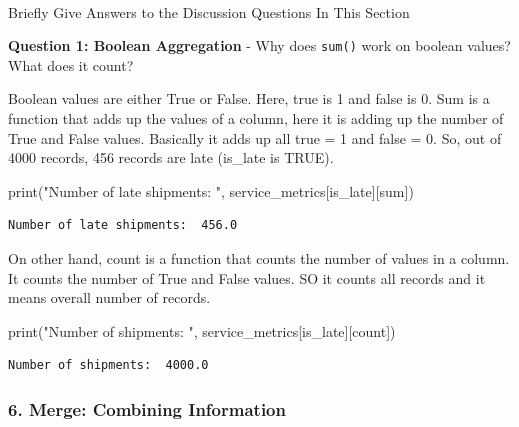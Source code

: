 \documentclass[
]{article}
\makeatletter
\let\oldparagraph\paragraph
\renewcommand{\paragraph}{
    \@ifstar
      \xxxParagraphStar
      \xxxParagraphNoStar
  }
\newcommand{\xxxParagraphStar}[1]{\oldparagraph*{#1}\mbox{}}
\newcommand{\xxxParagraphNoStar}[1]{\oldparagraph{#1}\mbox{}}
\newenvironment{Shaded}{\begin{snugshade}}{\end{snugshade}}
\newcommand{\BuiltInTok}[1]{\textcolor[rgb]{0.00,0.23,0.31}{#1}}
\newcommand{\NormalTok}[1]{\textcolor[rgb]{0.00,0.23,0.31}{#1}}
\newcommand{\StringTok}[1]{\textcolor[rgb]{0.13,0.47,0.30}{#1}}
\makeatother
\begin{document}
\paragraph{Briefly Give Answers to the Discussion Questions In This
Section}\label{briefly-give-answers-to-the-discussion-questions-in-this-section-4}

\textbf{Question 1: Boolean Aggregation} - Why does \texttt{sum()} work
on boolean values? What does it count?

Boolean values are either True or False. Here, true is 1 and false is 0.
Sum is a function that adds up the values of a column, here it is adding
up the number of True and False values. Basically it adds up all true =
1 and false = 0. So, out of 4000 records, 456 records are late (is\_late
is TRUE).

\label{boolean-aggregation-1}
\begin{Shaded}
\begin{Highlighting}[]
\BuiltInTok{print}\NormalTok{(}\StringTok{"Number of late shipments: "}\NormalTok{, service\_metrics[}\StringTok{\textquotesingle{}is\_late\textquotesingle{}}\NormalTok{][}\StringTok{\textquotesingle{}sum\textquotesingle{}}\NormalTok{])}
\end{Highlighting}
\end{Shaded}

\begin{verbatim}
Number of late shipments:  456.0
\end{verbatim}

On other hand, count is a function that counts the number of values in a
column. It counts the number of True and False values. SO it counts all
records and it means overall number of records.

\label{boolean-aggregation-2}
\begin{Shaded}
\begin{Highlighting}[]
\BuiltInTok{print}\NormalTok{(}\StringTok{"Number of shipments: "}\NormalTok{, service\_metrics[}\StringTok{\textquotesingle{}is\_late\textquotesingle{}}\NormalTok{][}\StringTok{\textquotesingle{}count\textquotesingle{}}\NormalTok{])}
\end{Highlighting}
\end{Shaded}

\begin{verbatim}
Number of shipments:  4000.0
\end{verbatim}

\subsubsection{6. Merge: Combining
Information}\label{merge-combining-information}
\end{document}
